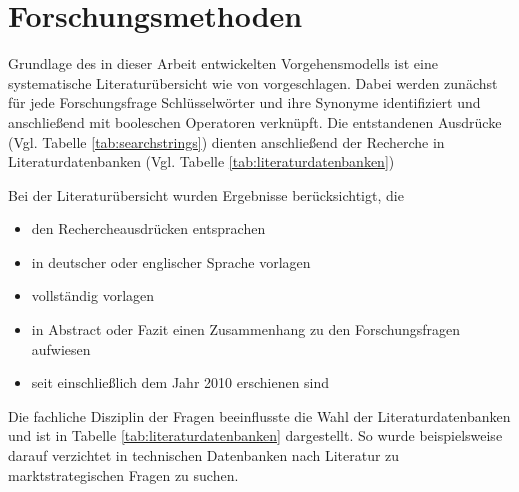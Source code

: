 \section{Forschungsmethoden}
\label{cha:method}
Grundlage des in dieser Arbeit entwickelten Vorgehensmodells ist eine
systematische Literaturübersicht wie von 
vorgeschlagen. Dabei werden zunächst für jede Forschungsfrage Schlüsselwörter
und ihre Synonyme identifiziert und anschließend mit booleschen Operatoren
verknüpft. Die entstandenen Ausdrücke (Vgl. Tabelle
\ref{tab:searchstrings}) dienten anschließend der Recherche in
Literaturdatenbanken (Vgl. Tabelle \ref{tab:literaturdatenbanken})


Bei der Literaturübersicht wurden Ergebnisse berücksichtigt, die
\begin{itemize}
	\item den Rechercheausdrücken entsprachen
	\item in deutscher oder englischer Sprache vorlagen
	\item vollständig vorlagen
	\item in Abstract oder Fazit einen Zusammenhang zu den Forschungsfragen
aufwiesen
	\item seit einschließlich dem Jahr 2010 erschienen sind
\end{itemize}

Die fachliche Disziplin der Fragen beeinflusste die Wahl der
Literaturdatenbanken und ist in Tabelle \ref{tab:literaturdatenbanken}
dargestellt. So wurde beispielsweise darauf verzichtet in technischen
Datenbanken nach Literatur zu marktstrategischen Fragen zu suchen.


\begin{comment}
In diesem Kapitel erläutern Sie ihre Forschungsmethode unter Verwendung von
entsprechenden Quellen.
Begründen Sie auch, warum Sie sich für diese Forschungsmethode entschieden
haben
und warum sie geeignet ist, die vorliegende Forschungsfrage zu beantworten.
\end{comment}
